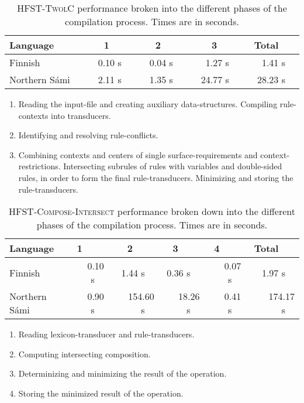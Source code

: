 \documentclass[a4paper]{article}
\begin{document}
\begin{table}[!h]
  \begin{center}
    \begin{tabular}{l|rrr|r}
      \hline
      Language & 1~~~~ & 2~~~~ & 3~~~~ & Total~~~ \\
      \hline
      Finnish & ~~0.10 s~~ & ~~0.04 s~~ & 1.27 s~~ & 1.41 s~~ \\
      Northern S\'ami~~ & 2.11 s~~ & 1.35 s~~ & ~~24.77 s~~ & ~~28.23 s~~ \\
      \hline
    \end{tabular}
    \vskip0.5cm
    \begin{enumerate}
    \item Reading the input-file and creating auxiliary
    data-structures. Compiling rule-contexts into transducers.
    \item Identifying and resolving rule-conflicts.
    \item Combining contexts and centers of single
    surface-requirements and context-restrictions. Intersecting subrules
    of rules with variables and double-sided rules, in order to form
    the final rule-transducers. Minimizing and storing the
    rule-transducers.
    \end{enumerate}
    \caption{\textsc{HFST-TwolC} performance broken into the different
    phases of the compilation process. Times are in
    seconds.}\label{fig:grammar-compilation-phases}
  \end{center}
\end{table}

\begin{table}[!h]
  \begin{center}
    \begin{tabular}{l|rrrr|r}
      \hline
      Language & 1~~~~ & 2~~~~ & 3~~~~ & 4~~~~ & Total~~~ \\
      \hline
      Finnish & 0.10 s~~ & 1.44 s~~ & 0.36 s~~ & 0.07 s~~ & 1.97 s~~ \\
      Northern S\'ami~~ & ~~0.90 s~~ & ~~154.60 s~~ & ~~18.26 s~~ & ~~0.41 s~~ & ~~174.17 s~~ \\
      \hline
    \end{tabular}
    \vskip0.5cm
    \begin{enumerate}
    \item Reading lexicon-transducer and rule-transducers.
    \item Computing intersecting composition.
    \item Determinizing and minimizing the result of the operation.
    \item Storing the minimized result of the operation.
    \end{enumerate}
    \caption{\textsc{HFST-Compose-Intersect} performance broken down
    into the different phases of the compilation process. Times are in
    seconds.}\label{fig:ci-phases}
  \end{center}
\end{table}
\end{document}
